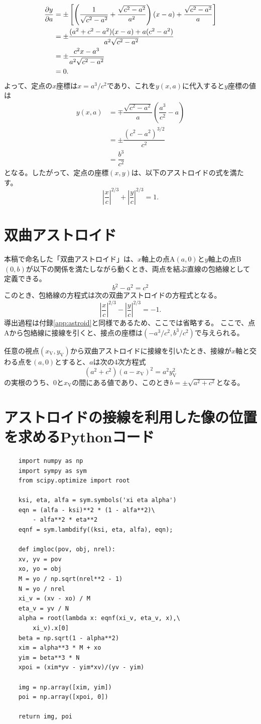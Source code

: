 \documentclass[twocolumn]{article}
\begin{document}
$$ \begin{aligned}
	{\frac{\partial y}{\partial a}} &= \pm\left[\left( \dfrac{1}{\sqrt{c^2-a^2}}+\dfrac{\sqrt{c^2-a^2}}{a^2}\right) (x-a) + \dfrac{\sqrt{c^2-a^2}}{a} \right]\\
	&= \pm \dfrac{(a^2+c^2-a^2)(x-a)+a(c^2-a^2)}{a^2\sqrt{c^2-a^2}}\\
	&= \pm \dfrac{c^2 x - a^3}{a^2 \sqrt{c^2 - a^2}}\\
	&= 0.
\end{aligned}
$$
よって、定点の$x$座標は$x = a^3/c^2$であり、これを$y(x, a)$に代入すると$y$座標の値は
$$ \begin{aligned}
	y(x, a) &= \mp \dfrac{\sqrt{c^2-a^2}}{a}\left(\dfrac{a^3}{c^2}-a\right)\\
	& = \pm \dfrac{\left( c^2- a^2 \right)^{3/2}}{c^2}\\
	& = \dfrac{b^3}{c^2}
\end{aligned}
$$
となる。したがって、定点の座標$(x, y)$は、以下のアストロイドの式を満たす。
$$ \left|\dfrac{x}{c}\right|^{2/3} + \left|\dfrac{y}{c}\right|^{2/3} = 1. $$

\section{双曲アストロイド}\label{app:hyperastroid}
本稿で命名した「双曲アストロイド」は、$x$軸上の点A$(a, 0)$と$y$軸上の点B$(0, b)$が以下の関係を満たしながら動くとき、両点を結ぶ直線の包絡線として定義できる。
$$b^2-a^2=c^2$$
このとき、包絡線の方程式は次の双曲アストロイドの方程式となる。
$$ \left|\dfrac{x}{c}\right|^{2/3} - \left|\dfrac{y}{c}\right|^{2/3} = -1. $$
導出過程は付録\ref{app:astroid}と同様であるため、ここでは省略する。
ここで、点Aから包絡線に接線を引くと、接点の座標は$(-a^3/c^2, b^3/c^2)$で与えられる。

任意の視点$(x_{\mathrm{V}}, y_{\mathrm{V}})$から双曲アストロイドに接線を引いたとき、接線が$x$軸と交わる点を$(a,0)$とすると、$a$は次の4次方程式
$$ \left( a^2 + c^2 \right) \left(a - x_{\mathrm{V}} \right)^2 = a^2 y_{\mathrm{V}}^2$$
の実根のうち、$0$と$x_{\mathrm{V}}$の間にある値であり、このとき$b = \pm \sqrt{a^2 + c^2}$となる。

\section{アストロイドの接線を利用した像の位置を求めるPythonコード} \label{app:python}
\begin{verbatim}
	import numpy as np
	import sympy as sym
	from scipy.optimize import root
	
	ksi, eta, alfa = sym.symbols('xi eta alpha')
	eqn = (alfa - ksi)**2 * (1 - alfa**2)\
	    - alfa**2 * eta**2
	eqnf = sym.lambdify((ksi, eta, alfa), eqn);
	
	def imgloc(pov, obj, nrel):
	xv, yv = pov
	xo, yo = obj
	M = yo / np.sqrt(nrel**2 - 1)
	N = yo / nrel
	xi_v = (xv - xo) / M
	eta_v = yv / N
	alpha = root(lambda x: eqnf(xi_v, eta_v, x),\
	    xi_v).x[0]
	beta = np.sqrt(1 - alpha**2)
	xim = alpha**3 * M + xo
	yim = beta**3 * N
	xpoi = (xim*yv - yim*xv)/(yv - yim)
	
	img = np.array([xim, yim])
	poi = np.array([xpoi, 0])
	
	return img, poi
\end{verbatim}
\end{document}

